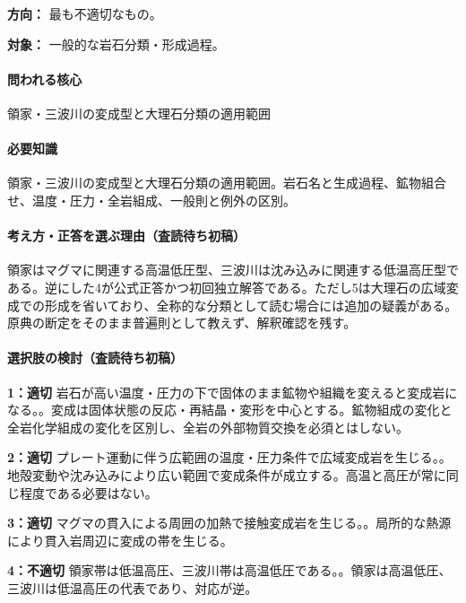 \noindent\textbf{方向：} 最も不適切なもの。\par

\noindent\textbf{対象：} 一般的な岩石分類・形成過程。\par

\paragraph{問われる核心} 領家・三波川の変成型と大理石分類の適用範囲

\paragraph{必要知識} 領家・三波川の変成型と大理石分類の適用範囲。岩石名と生成過程、鉱物組合せ、温度・圧力・全岩組成、一般則と例外の区別。

\paragraph{考え方・正答を選ぶ理由（査読待ち初稿）} 領家はマグマに関連する高温低圧型、三波川は沈み込みに関連する低温高圧型である。逆にした4が公式正答かつ初回独立解答である。ただし5は大理石の広域変成での形成を省いており、全称的な分類として読む場合には追加の疑義がある。原典の断定をそのまま普遍則として教えず、解釈確認を残す。

\paragraph{選択肢の検討（査読待ち初稿）}\mbox{}\par

\noindent\textbf{1：適切} 岩石が高い温度・圧力の下で固体のまま鉱物や組織を変えると変成岩になる。。変成は固体状態の反応・再結晶・変形を中心とする。鉱物組成の変化と全岩化学組成の変化を区別し、全岩の外部物質交換を必須とはしない。\par

\noindent\textbf{2：適切} プレート運動に伴う広範囲の温度・圧力条件で広域変成岩を生じる。。地殻変動や沈み込みにより広い範囲で変成条件が成立する。高温と高圧が常に同じ程度である必要はない。\par

\noindent\textbf{3：適切} マグマの貫入による周囲の加熱で接触変成岩を生じる。。局所的な熱源により貫入岩周辺に変成の帯を生じる。\par

\noindent\textbf{4：不適切} 領家帯は低温高圧、三波川帯は高温低圧である。。領家は高温低圧、三波川は低温高圧の代表であり、対応が逆。\par

